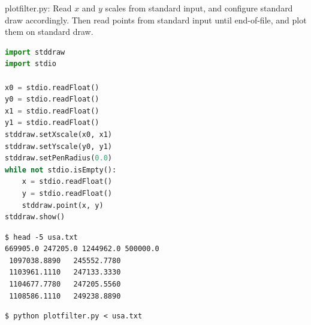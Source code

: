 \documentclass[8pt,a4paper,compress]{beamer}
\begin{document}
\begin{frame}[fragile]
\pause

\begin{framed}
\tiny plotfilter.py: Read $x$ and $y$ scales from standard input, and configure standard draw accordingly. Then read points from standard input until end-of-file, and plot them on standard draw.
\end{framed}

\begin{lstlisting}[language=Python]
import stddraw
import stdio

x0 = stdio.readFloat()
y0 = stdio.readFloat()
x1 = stdio.readFloat()
y1 = stdio.readFloat()
stddraw.setXscale(x0, x1)
stddraw.setYscale(y0, y1)
stddraw.setPenRadius(0.0)
while not stdio.isEmpty():
    x = stdio.readFloat()
    y = stdio.readFloat()
    stddraw.point(x, y)
stddraw.show()
\end{lstlisting}

\pause

\begin{minipage}{150pt}
\begin{lstlisting}[language={}]
$ head -5 usa.txt 
669905.0 247205.0 1244962.0 500000.0
 1097038.8890   245552.7780
 1103961.1110   247133.3330
 1104677.7780   247205.5560
 1108586.1110   249238.8890
\end{lstlisting}

\pause

\begin{lstlisting}[language={}]
$ python plotfilter.py < usa.txt
\end{lstlisting}
\end{minipage}%
\begin{minipage}{150pt}
\hfill {}
\end{minipage}
\end{frame}
\end{document}
